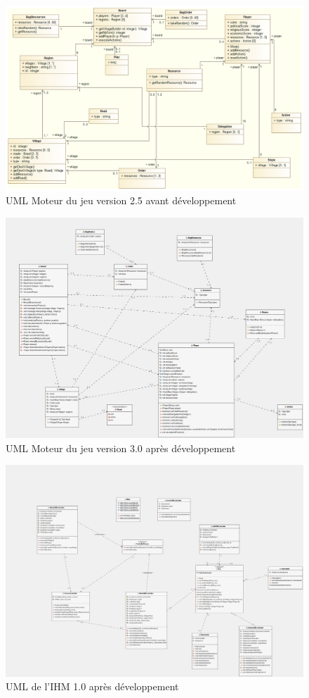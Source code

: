 \begin{figure}[h]
	\centering
	\includegraphics[width=1\linewidth]{images/UML_Himalaya_2}
	\caption{UML Moteur du jeu version 2.5 avant développement}
	\label{fig:UMLCore1}
\end{figure}
\begin{figure}[h]
	\centering
	\includegraphics[width=1\linewidth]{images/UML_Himalaya_CORE_3}
	\caption{UML Moteur du jeu version 3.0 après développement}
	\label{fig:UMLCore2}
\end{figure}
\begin{figure}[h]
	\centering
	\includegraphics[width=1\linewidth]{images/UML_Himalaya_IHM_1}
	\caption{UML de l'IHM 1.0 après développement}
	\label{fig:UML_IHM}
\end{figure}
